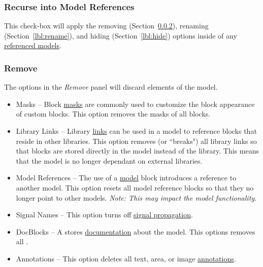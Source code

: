 \documentclass{article}
\begin{document}
\subsubsection{Recurse into Model References}
This check-box will apply the removing (Section~\ref{lbl:remove}), renaming (Section~\ref{lbl:rename}), and hiding (Section~\ref{lbl:hide}) options inside of any \href{https://de.mathworks.com/help/simulink/model-reference.html}{referenced models}.

\subsubsection{Remove}
\label{lbl:remove}
The options in the \emph{Remove} panel will discard elements of the model.

\begin{itemize}
	\item Masks -- Block \href{https://www.mathworks.com/help/simulink/ug/block-masks.html}{masks} are commonly used to customize the block appearance of custom blocks. This option removes the masks of all blocks. 
	
	\item Library Links -- Library \href{https://www.mathworks.com/help/simulink/ug/creating-and-working-with-linked-blocks.html}{links} can be used in a model to reference blocks that reside in other libraries. This option removes (or ``breaks") all library links so that blocks are stored directly in the model instead of the library. This means that the model is no longer dependant on external libraries.
	
	\item Model References -- The use of a \href{https://www.mathworks.com/help/simulink/slref/model.html}{model} block introduces a reference to another model. This option resets all model reference blocks so that they no longer point to other models. \emph{Note: This may impact the model functionality.}
	
	\item Signal Names -- This option turns off \href{https://www.mathworks.com/help/simulink/ug/signal-label-propagation.html}{signal propagation}.
	
	\item DocBlocks -- A \docblock stores \href{https://www.mathworks.com/help/simulink/slref/docblock.html}{documentation} about the model. This options removes all .
	
	\item Annotations -- This option deletes all text, area, or image \href{https://www.mathworks.com/help/simulink/ug/annotations.html}{annotations}.
	

\end{itemize}
\end{document}

